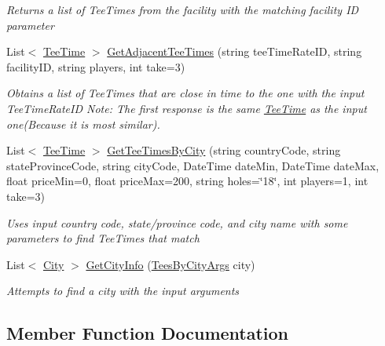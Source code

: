 \begin{DoxyCompactItemize}
\begin{DoxyCompactList}\small\item\em Returns a list of Tee\+Times from the facility with the matching facility ID parameter \end{DoxyCompactList}\item 
List$<$ \mbox{\hyperlink{class_golf_now_a_p_i_1_1_tee_time}{Tee\+Time}} $>$ \mbox{\hyperlink{class_golf_now_a_p_i_1_1_golf_now_a_p_i_handler_a851716215095e024dee5add6c861cb4a}{Get\+Adjacent\+Tee\+Times}} (string tee\+Time\+Rate\+ID, string facility\+ID, string players, int take=3)
\begin{DoxyCompactList}\small\item\em Obtains a list of Tee\+Times that are close in time to the one with the input Tee\+Time\+Rate\+ID Note\+: The first response is the same \mbox{\hyperlink{class_golf_now_a_p_i_1_1_tee_time}{Tee\+Time}} as the input one(\+Because it is most similar). \end{DoxyCompactList}\item 
List$<$ \mbox{\hyperlink{class_golf_now_a_p_i_1_1_tee_time}{Tee\+Time}} $>$ \mbox{\hyperlink{class_golf_now_a_p_i_1_1_golf_now_a_p_i_handler_aaf93dac9ec215cd0d6574d9e4c8de096}{Get\+Tee\+Times\+By\+City}} (string country\+Code, string state\+Province\+Code, string city\+Code, Date\+Time date\+Min, Date\+Time date\+Max, float price\+Min=0, float price\+Max=200, string holes=\char`\"{}18\char`\"{}, int players=1, int take=3)
\begin{DoxyCompactList}\small\item\em Uses input country code, state/province code, and city name with some parameters to find Tee\+Times that match \end{DoxyCompactList}\item 
List$<$ \mbox{\hyperlink{class_golf_now_a_p_i_1_1_city}{City}} $>$ \mbox{\hyperlink{class_golf_now_a_p_i_1_1_golf_now_a_p_i_handler_ab5e24ebfbcb30d11d8f8a0f663e4c794}{Get\+City\+Info}} (\mbox{\hyperlink{class_golf_now_a_p_i_1_1_tees_by_city_args}{Tees\+By\+City\+Args}} city)
\begin{DoxyCompactList}\small\item\em Attempts to find a city with the input arguments \end{DoxyCompactList}\end{DoxyCompactItemize}


\subsection{Member Function Documentation}
\mbox{\label{class_golf_now_a_p_i_1_1_golf_now_a_p_i_handler_a8ba0b542b68c1e48166b59c6d6b167fd}} 
